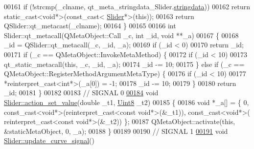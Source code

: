 \begin{DoxyCode}
00161     \textcolor{keywordflow}{if} (!strcmp(\_clname, qt\_meta\_stringdata\_Slider.\hyperlink{a00070_aa9f32a65077d2d4f1c99ac3536a308da}{stringdata}))
00162         \textcolor{keywordflow}{return} \textcolor{keyword}{static\_cast<}\textcolor{keywordtype}{void}*\textcolor{keyword}{>}(\textcolor{keyword}{const\_cast<} \hyperlink{a00077}{Slider}*\textcolor{keyword}{>}(\textcolor{keyword}{this}));
00163     \textcolor{keywordflow}{return} QSlider::qt\_metacast(\_clname);
00164 \}
00165 
00166 \textcolor{keywordtype}{int} Slider::qt\_metacall(QMetaObject::Call \_c, \textcolor{keywordtype}{int} \_id, \textcolor{keywordtype}{void} **\_a)
00167 \{
00168     \_id = QSlider::qt\_metacall(\_c, \_id, \_a);
00169     \textcolor{keywordflow}{if} (\_id < 0)
00170         \textcolor{keywordflow}{return} \_id;
00171     \textcolor{keywordflow}{if} (\_c == QMetaObject::InvokeMetaMethod) \{
00172         \textcolor{keywordflow}{if} (\_id < 10)
00173             qt\_static\_metacall(\textcolor{keyword}{this}, \_c, \_id, \_a);
00174         \_id -= 10;
00175     \} \textcolor{keywordflow}{else} \textcolor{keywordflow}{if} (\_c == QMetaObject::RegisterMethodArgumentMetaType) \{
00176         \textcolor{keywordflow}{if} (\_id < 10)
00177             *\textcolor{keyword}{reinterpret\_cast<}\textcolor{keywordtype}{int}*\textcolor{keyword}{>}(\_a[0]) = -1;
00178         \_id -= 10;
00179     \}
00180     \textcolor{keywordflow}{return} \_id;
00181 \}
00182 
00183 \textcolor{comment}{// SIGNAL 0}
\hypertarget{a00070_source_l00184}{}\hyperlink{a00077_a886f07f2c612121bec703581f9398a10}{00184} \textcolor{keywordtype}{void} \hyperlink{a00077_a886f07f2c612121bec703581f9398a10}{Slider::action\_set\_value}(\textcolor{keywordtype}{double} \_t1, \hyperlink{a00004_a979e3e23b9a449e69ab6a8a83b6042f8}{Uint8} \_t2)
00185 \{
00186     \textcolor{keywordtype}{void} *\_a[] = \{ 0, \textcolor{keyword}{const\_cast<}\textcolor{keywordtype}{void}*\textcolor{keyword}{>}(\textcolor{keyword}{reinterpret\_cast<}\textcolor{keyword}{const }\textcolor{keywordtype}{void}*\textcolor{keyword}{>}(&\_t1)), \textcolor{keyword}{const\_cast<}\textcolor{keywordtype}{void}*\textcolor{keyword}{>}(\textcolor{keyword}{
      reinterpret\_cast<}\textcolor{keyword}{const }\textcolor{keywordtype}{void}*\textcolor{keyword}{>}(&\_t2)) \};
00187     QMetaObject::activate(\textcolor{keyword}{this}, &staticMetaObject, 0, \_a);
00188 \}
00189 
00190 \textcolor{comment}{// SIGNAL 1}
\hypertarget{a00070_source_l00191}{}\hyperlink{a00077_a49696761b5c638a3b2d58b16af9773e0}{00191} \textcolor{keywordtype}{void} \hyperlink{a00077_a49696761b5c638a3b2d58b16af9773e0}{Slider::update\_curve\_signal}()

\end{DoxyCode}
